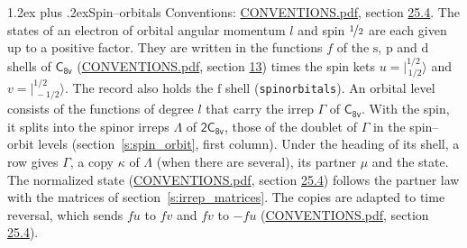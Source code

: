 \documentclass[10pt,a4paper]{article}
\makeatletter
\renewcommand\section{\@startsection{section}{1}{\z@}{-3ex plus -1ex minus -.2ex}%
  {1.2ex plus .2ex}{\normalfont\large\sffamily\bfseries\color{parttitle}}}
\numberwithin{equation}{section}
\newcommand{\grp}[1]{\mathsf{#1}}
\newcommand{\orbital}[1]{\mathrm{#1}}
\newcommand{\mult}{\kappa}
\newcommand{\intx}{\mu}
\newcommand{\jm}[2]{\bigl\lvert{}^{#1}_{\,#2}\bigr\rangle}
\makeatother
\begin{document}
\section{Spin--orbitals}\label{s:spin_orbitals}
Conventions: \href{../../CONVENTIONS.pdf}{CONVENTIONS.pdf}, section \href{../../CONVENTIONS.pdf\#conv.25.4}{25.4}.
\leavevmode\label{n:index.orbital.l}The states of an electron of orbital angular momentum $l$ and spin $\nicefrac{1}{2}$ are each given up to a positive factor. \label{n:local.spinor.uv}\label{n:local.function.f}They are written in the functions $f$ of the $\orbital{s}$, $\orbital{p}$ and $\orbital{d}$ shells of \href{../../../rotation/data/pdf/C8v.pdf}{$\grp{C_{8v}}$} (\href{../../CONVENTIONS.pdf}{CONVENTIONS.pdf}, section \href{../../../rotation/CONVENTIONS.pdf\#conv.13}{13}) times the spin kets $u = \jm{1/2}{1/2}$ and $v = \jm{1/2}{-1/2}$. The record also holds the $\orbital{f}$ shell (\texttt{spinorbitals}). An orbital level consists of the functions of degree $l$ that carry the irrep $\Gamma$ of \href{../../../rotation/data/pdf/C8v.pdf}{$\grp{C_{8v}}$}. With the spin, it splits into the spinor irreps $\Lambda$ of $\grp{2C_{8v}}$, those of the doublet of $\Gamma$ in the spin--orbit levels (section~\ref{s:spin_orbit}, first column). \label{n:head.state}Under the heading of its shell, a row gives $\Gamma$, a copy $\mult$ of $\Lambda$ (when there are several), its partner $\intx$ and the state. The normalized state (\href{../../CONVENTIONS.pdf}{CONVENTIONS.pdf}, section \href{../../CONVENTIONS.pdf\#conv.25.4}{25.4}) follows the partner law with the matrices of section~\ref{s:irrep_matrices}. The copies are adapted to time reversal, which sends $f u$ to $f v$ and $f v$ to $-f u$ (\href{../../CONVENTIONS.pdf}{CONVENTIONS.pdf}, section \href{../../CONVENTIONS.pdf\#conv.25.4}{25.4}).
\end{document}
